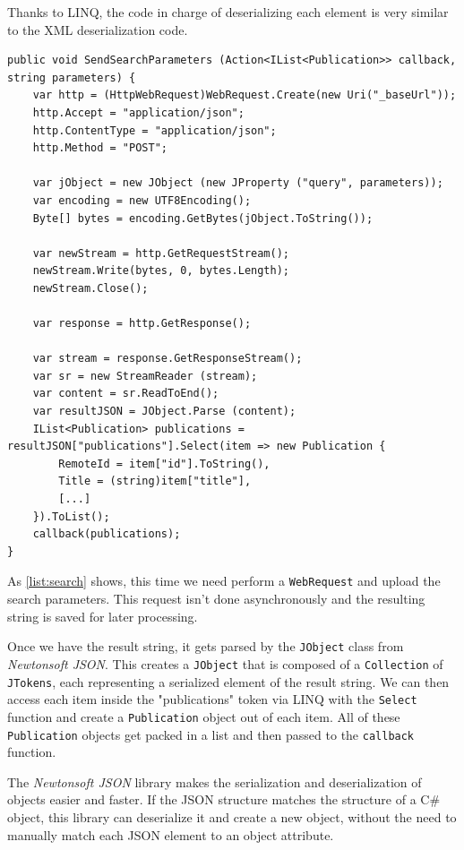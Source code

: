 Thanks to \ac{LINQ}, the code in charge of deserializing each element is very similar to the \ac{XML} deserialization code.

\begin{lstlisting}[frame=lt,caption=Publication Search,label={list:search}]
public void SendSearchParameters (Action<IList<Publication>> callback, string parameters) {
	var http = (HttpWebRequest)WebRequest.Create(new Uri("_baseUrl"));
	http.Accept = "application/json";
	http.ContentType = "application/json";
	http.Method = "POST";

	var jObject = new JObject (new JProperty ("query", parameters));
	var encoding = new UTF8Encoding();
	Byte[] bytes = encoding.GetBytes(jObject.ToString());

	var newStream = http.GetRequestStream();
	newStream.Write(bytes, 0, bytes.Length);
	newStream.Close();

	var response = http.GetResponse();

	var stream = response.GetResponseStream();
	var sr = new StreamReader (stream);
	var content = sr.ReadToEnd();
	var resultJSON = JObject.Parse (content);
	IList<Publication> publications = resultJSON["publications"].Select(item => new Publication	{
		RemoteId = item["id"].ToString(),
		Title = (string)item["title"],
		[...]			
	}).ToList();
	callback(publications);
}
\end{lstlisting}

As \autoref{list:search} shows, this time we need perform a \texttt{WebRequest} and upload the search parameters. This request isn't done asynchronously and the resulting string is saved for later processing.

Once we have the result string, it gets parsed by the \texttt{JObject} class from \textit{Newtonsoft JSON}. This creates a \texttt{JObject} that is composed of a \texttt{Collection} of \texttt{JTokens}, each representing a serialized element of the result string. We can then access each item inside the "publications" token via \ac{LINQ} with the \texttt{Select} function and create a \texttt{Publication} object out of each item. All of these \texttt{Publication} objects get packed in a list and then passed to the \texttt{callback} function.

The \textit{Newtonsoft JSON} library makes the serialization and deserialization of objects easier and faster. If the \ac{JSON} structure matches the structure of a C\# object, this library can deserialize it and create a new object, without the need to manually match each \ac{JSON} element to an object attribute.
 

